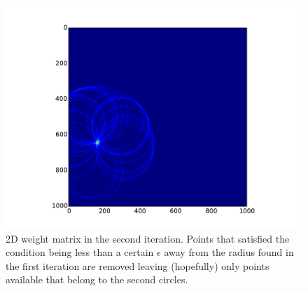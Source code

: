 \documentclass[11pt,twoside]{scrreprt}
\begin{document}
\begin{figure}[hp]
  \centering
  \includegraphics[width=0.8\linewidth]{pics/2d_weights_02}
  \caption{2D weight matrix in the second iteration. Points that satisfied the condition being less than a certain $\epsilon$ away from the radius found in the first iteration are removed leaving (hopefully) only points available that belong to the second circles.}
  \label{fig:2d_weights_02}
\end{figure}
\clearpage
\end{document}
